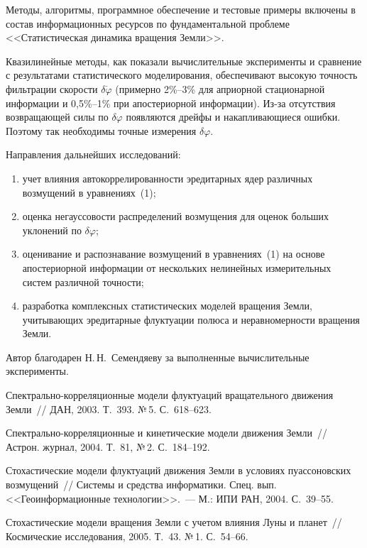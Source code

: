 \begin{multicols}{2}
Методы, алгоритмы, программное обеспечение и тестовые примеры
включены в состав информационных ресурсов по фундаментальной
проблеме <<Статистическая динамика вращения Земли>>.

Квазилинейные методы, как показали вычислительные эксперименты и
сравнение с результатами статистического моделирования, обеспечивают
высокую точность фильтрации скорости $\delta \dot\varphi$ (примерно
2\%--3\% для априорной стационарной информации и 0,5\%--1\% при
апостериорной информации). Из-за отсутствия возвращающей силы по
$\delta \varphi$ появляются дрейфы и накапливающиеся ошибки. Поэтому
так необходимы точные измерения $\delta \varphi$.

Направления дальнейших исследований:
\begin{enumerate}[(1)]
\item учет влияния автокоррелированности эредитарных ядер различных
возмущений в уравнениях~(1);
\item
оценка негауссовости распределений возмущения для оценок больших
уклонений по $\delta \varphi$;
\item
оценивание и распознавание возмущений в уравнениях~(1) на основе
апостериорной информации от нескольких нелинейных измерительных
систем различной точности;
\item
разработка комплексных статистических моделей вращения Земли,
учитывающих эредитарные флуктуации полюса и неравномерности вращения
Земли.
\end{enumerate}

\bigskip
Автор благодарен Н.\,Н.~Семендяеву за выполненные вычислительные
эксперименты.


{\small\frenchspacing
{%
\begin{thebibliography}{99}
Спектрально-кор\-ре\-ля\-ци\-он\-ные модели флуктуаций вращательного движения Земли~// 
ДАН,  2003.  Т.~393.  №\,5. С.~618--623.

Спектрально-кор\-ре\-ля\-ци\-он\-ные и кинетические модели движения Земли~// 
Астрон. журнал,  2004.  Т.~81,  №\,2. С.~184--192.

Стохастические модели флуктуаций движения
Земли в условиях пуассоновских возмущений~// Системы и средства
информатики. Спец. вып. <<Геоинформационные технологии>>.~--- М.: ИПИ
РАН, 2004.  С.~39--55.

Стохастические модели  вращения Земли с учетом влияния Луны и планет~// 
Космические исследования, 2005. Т.~43.  №\,1. С.~54--66.


\end{thebibliography}}}
\end{multicols}
